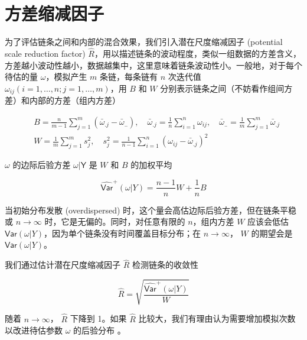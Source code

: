 \documentclass[12pt,a4paper,UTF8,twoside]{book}
\theoremstyle{definition}
\theoremstyle{definition}
\theoremstyle{definition}
\theoremstyle{remark}
\begin{document}
\hypertarget{sec:scale-r-hat}{%
\section{方差缩减因子}\label{sec:scale-r-hat}}

为了评估链条之间和内部的混合效果，我们引入潜在尺度缩减因子 (potential
scale reduction factor)
\(\hat{R}\)，用以描述链条的波动程度，类似一组数据的方差含义，方差越小波动性越小，数据越集中，这里意味着链条波动性小。一般地，对于每个待估的量
\(\omega\)，模拟产生 \(m\) 条链，每条链有 \(n\) 次迭代值
\(\omega_{ij} (i = 1,\ldots,n;j=1,\ldots,m)\)，用 \(B\) 和 \(W\)
分别表示链条之间（不妨看作组间方差）和内部的方差（组内方差）

\begin{equation}
\begin{aligned}
& B = \frac{n}{m-1}\sum_{j=1}^{m}(\bar{\omega}_{.j} - \bar{\omega}_{..} ), \quad \bar{\omega}_{.j} = \frac{1}{n}\sum_{i=1}^{n}\omega_{ij}, \quad \bar{\omega}_{..} = \frac{1}{m}\sum_{j=1}^{m} \bar{\omega}_{.j}\\
& W = \frac{1}{m}\sum_{j=1}^{m}s^{2}_{j}, \quad s^{2}_{j} = \frac{1}{n-1}\sum_{i=1}^{n}(\omega_{ij} - \bar{\omega}_{.j})^2
\end{aligned} \label{eq:potential-scale-reduction}
\end{equation}

\(\omega\) 的边际后验方差 \(\mathsf{\omega|Y}\) 是 \(W\) 和 \(B\)
的加权平均

\begin{equation}
\widehat{\mathsf{Var}}^{+}(\omega|Y) = \frac{n-1}{n} W + \frac{1}{n} B 
\end{equation}

当初始分布发散 (overdispersed)
时，这个量会高估边际后验方差，但在链条平稳或 \(n \to \infty\)
时，它是无偏的。同时，对任意有限的 \(n\)，组内方差 \(W\) 应该会低估
\(\mathsf{Var}(\omega|Y)\)，因为单个链条没有时间覆盖目标分布；在
\(n \to \infty\)， \(W\) 的期望会是 \(\mathsf{Var}(\omega|Y)\)。

我们通过估计潜在尺度缩减因子 \(\hat{R}\) 检测链条的收敛性

\begin{equation}
\hat{R} = \sqrt{\frac{\widehat{\mathsf{Var}}^{+}(\omega|Y)}{W}}
\end{equation}

随着 \(n \to \infty\)， \(\hat{R}\) 下降到 1。如果 \(\hat{R}\)
比较大，我们有理由认为需要增加模拟次数以改进待估参数 \(\omega\)
的后验分布 \citep{Gelman2013R}。
\end{document}
